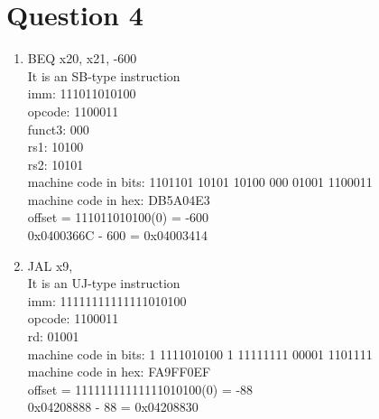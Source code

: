 \documentclass[12pt,letterpaper]{article}
\begin{document}
\section*{Question 4}
\begin{enumerate}
\item
BEQ x20, x21, -600
\\It is an SB-type instruction
\\imm: 111011010100
\\opcode: 1100011
\\funct3: 000
\\rs1: 10100
\\rs2: 10101
\\machine code in bits: 1101101 10101 10100 000 01001 1100011
\\machine code in hex: DB5A04E3
\\ offset = 111011010100(0) = -600
\\ 0x0400366C - 600 = 0x04003414

\item
JAL x9, 
\\It is an UJ-type instruction
\\imm: 11111111111111010100
\\opcode: 1100011
\\rd: 01001
\\machine code in bits: 1 1111010100 1 11111111 00001 1101111
\\machine code in hex: FA9FF0EF
\\ offset = 11111111111111010100(0) = -88
\\ 0x04208888 - 88 = 0x04208830
\end{enumerate}
\end{document}

